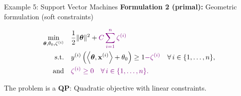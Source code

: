 \documentclass[11pt,compress,t,notes=noshow, xcolor=table]{beamer}
\begin{document}
\begin{frame2}{Example 5: Support Vector Machines}
\textbf{Formulation 2 (primal): } Geometric formulation (soft constraints)

$$
\begin{aligned}
\min\limits_{\bm{\theta}, \theta_0, \zeta^{(i)}} \quad & \frac{1}{2} \|\bm{\theta}\|^2 + \textcolor{violet}{C   \sum_{i=1}^n \zeta^{(i)}} \\
\text{s.t.} \quad & y^{(i)}  \left( \left\langle \bm{\theta}, \mathbf{x}^{(i)} \right\rangle + \theta_0 \right) \ge 1 \textcolor{violet}{- \zeta^{(i)}} \quad \forall\, i \in \{1, \ldots, n\}, \\
\text{and} \quad & \textcolor{violet}{\zeta^{(i)} \ge 0 \quad \forall\, i \in \{1, \ldots, n\}.}
\end{aligned}
$$


\spacer

The problem is a \textbf{QP}: Quadratic objective with linear constraints.

\end{frame2}
\end{document}
